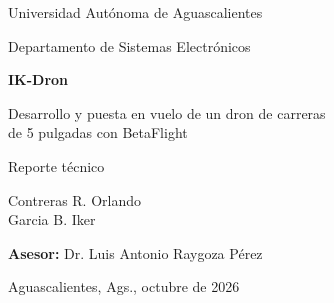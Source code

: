 \documentclass[11pt,letterpaper]{article}
\begin{document}
\begin{titlepage}
\centering
{\large Universidad Autónoma de Aguascalientes\par}
{\normalsize Departamento de Sistemas Electrónicos\par}
\vspace{3.5cm}
{\Huge\bfseries IK-Dron\par}
\vspace{0.5cm}
{\Large Desarrollo y puesta en vuelo de un dron de carreras\\ de 5 pulgadas con BetaFlight\par}
\vspace{0.8cm}
{\large Reporte técnico\par}
\vspace{3cm}
{\large Contreras R. Orlando\\ Garcia B. Iker\par}
\vspace{1cm}
{\normalsize \textbf{Asesor:} Dr. Luis Antonio Raygoza Pérez\par}
\vfill
{\normalsize Aguascalientes, Ags., octubre de 2026\par}
\end{titlepage}

\begin{abstract}
Este documento describe el desarrollo del proyecto IK-Dron, un dron aéreo de carreras de 5 pulgadas construido sobre el frame LS210. El proyecto inició con una controladora CC3D programada con LibrePilot, la cual sufrió una falla irreparable en su microcontrolador. Esto motivó la migración a una controladora SpeedyBee F405 V4 con firmware BetaFlight 4.4.3. Se presentan la arquitectura del sistema, sus especificaciones, la configuración actual del firmware, los problemas encontrados durante la puesta en vuelo junto con su solución, y los procedimientos de seguridad derivados de las pruebas. Como resultado, el dron logró un vuelo estable el 13 de octubre de 2026 en modo de autonivelado. El registro detallado, día por día, de las actividades se encuentra en el documento complementario \textit{IK-Dron Log File}, al cual se hace referencia a lo largo de este reporte.

\vspace{0.5em}
\noindent\textbf{Palabras clave:} Drone, BetaFlight, Control PID, SpeedyBee F405 V4.
\end{abstract}
\end{document}
